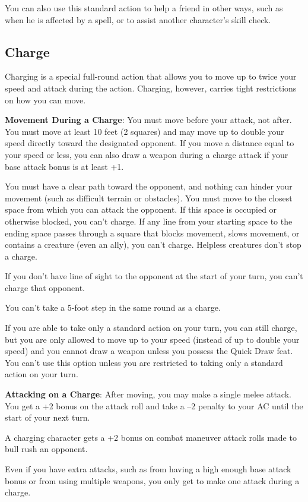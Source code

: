 You can also use this standard action to help a friend in other ways, such as when he is affected by a spell, or to assist another character's skill check.
				
\subsection{Charge}

				
Charging is a special full-round action that allows you to move up to twice your speed and attack during the action. Charging, however, carries tight restrictions on how you can move.
				
\textbf{Movement During a Charge}: You must move before your attack, not after. You must move at least 10 feet (2 squares) and may move up to double your speed directly toward the designated opponent. If you move a distance equal to your speed or less, you can also draw a weapon during a charge attack if your base attack bonus is at least +1.
				
You must have a clear path toward the opponent, and nothing can hinder your movement (such as difficult terrain or obstacles). You must move to the closest space from which you can attack the opponent. If this space is occupied or otherwise blocked, you can't charge. If any line from your starting space to the ending space passes through a square that blocks movement, slows movement, or contains a creature (even an ally), you can't charge. Helpless creatures don't stop a charge.
				
If you don't have line of sight to the opponent at the start of your turn, you can't charge that opponent.
				
You can't take a 5-foot step in the same round as a charge.
				
If you are able to take only a standard action on your turn, you can still charge, but you are only allowed to move up to your speed (instead of up to double your speed) and you cannot draw a weapon unless you possess the Quick Draw feat. You can't use this option unless you are restricted to taking only a standard action on your turn.
				
\textbf{Attacking on a Charge}: After moving, you may make a single melee attack. You get a +2 bonus on the attack roll and take a --2 penalty to your AC until the start of your next turn.
				
A charging character gets a +2 bonus on combat maneuver attack rolls made to bull rush an opponent.
				
Even if you have extra attacks, such as from having a high enough base attack bonus or from using multiple weapons, you only get to make one attack during a charge.
				
